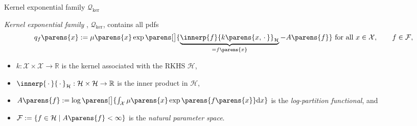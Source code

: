 \documentclass[aspectratio=169,xcolor=dvipsnames]{beamer}
\begin{document}
\begin{frame}{Kernel exponential family $\mathcal{Q}_{\mathrm{ker}}$}
	
	\textit{Kernel exponential family} \parencite{Canu2006-ig}, $\mathcal{Q}_{\mathrm{ker}}$, contains all pdfs %
	\begin{align}
		q_f \parens{x} := \mu \parens{x} \exp \parens[\big]{ \underbrace{ \innerp{f}{k \parens{x, \,\cdot\,}}_{\mathcal{H}} }_{ = f \parens{x}}
		- A \parens{f}} \text{ for all } x \in \mathcal{X}, \qquad f \in \mathcal{F}, 
	\end{align}
	\vspace{-5pt}
	\begin{itemize}
		\item $k: \mathcal{X} \times \mathcal{X} \to \mathbb{R}$ is the kernel associated with the RKHS $\mathcal{H}$, 
		\item $\innerp{\,\cdot\,}{\,\cdot\,}_{\mathcal{H}}: \mathcal{H} \times \mathcal{H} \to \mathbb{R}$ is the inner product in $\mathcal{H}$, 
		\item $A \parens{f} := \log \parens[\big]{\int_{\mathcal{X}} \mu \parens{x} \exp \parens{f \parens{x} } \mathrm{d} x}$ is the \textit{log-partition functional}, and 
		\item $\mathcal{F} := \{f \in \mathcal{H} \mid A \parens{f} < \infty \}$ is the \textit{natural parameter space}. 
	\end{itemize}
	
%	
	
%	
			
\end{frame}
\end{document}
